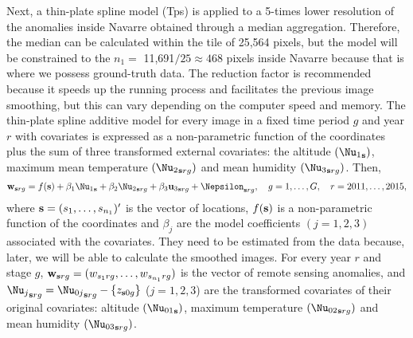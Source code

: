 Next, a thin-plate spline model (Tps) is applied to a 5-times lower resolution of the anomalies inside Navarre obtained through a median aggregation. Therefore, the median can be calculated within the tile of 25,564 pixels, but the model will be constrained to the $n_1=$ 11,691$/25\approx 468$ pixels inside Navarre because that is where we possess ground-truth data. The reduction factor is recommended because it speeds up the running process and facilitates the previous image smoothing, but this can vary depending on the computer speed and memory.
The thin-plate spline additive model for every image in a fixed time period $g$ and year $r$ with covariates is expressed as a non-parametric function of the coordinates plus the sum of three transformed external covariates: the altitude $({\Nu_{1}}_{{\bf s} })$,
maximum mean temperature $({\Nu_{2}}_{{\bf s} rg})$ and mean humidity $({\Nu_{3}}_{{\bf s} rg})$. Then,
\begin{equation}\label{TpsWc}
\mathbf{w}_{{\bf s}rg} =f({{\bf s}}) + \beta_1{\Nu_1}_{\bf s}+\beta_2{\Nu_2}_{{\bf s}rg}+ \beta_3{{\bf u}_3}_{{\bf s}rg}+\Nepsilon_{{\bf s}rg},
\quad g=1,\ldots,G, \quad r=2011,\ldots,2015,
\end{equation}
where ${\bf s}=(s_1,\ldots,s_{n_1})'$ is the vector of locations, %
$f({{\bf s}})$ is a non-parametric function of the coordinates and $\beta_j$ are the model coefficients $(j = 1,2,3)$ associated with the covariates. They need to be estimated from the data because, later, we will be able to calculate the smoothed images. For every year $r$ and stage $g$,
$\mathbf{w}_{{\bf s}rg}=(w_{s_1rg},\ldots,w_{s_{n_1}rg})$ is the vector of remote sensing anomalies, and
${\Nu_j}_{{\bf s} rg}={\Nu_{0j}}_{{\bf s} rg} -\{z_{{\bf s}0g}\}$ ($j=1,2,3$) are the transformed covariates of their original covariates: altitude $({\Nu_{01}}_{\bf s })$, maximum temperature $({\Nu_{02}}_{{\bf s} rg})$ and mean humidity $({\Nu_{03}}_{{\bf s} rg})$.

